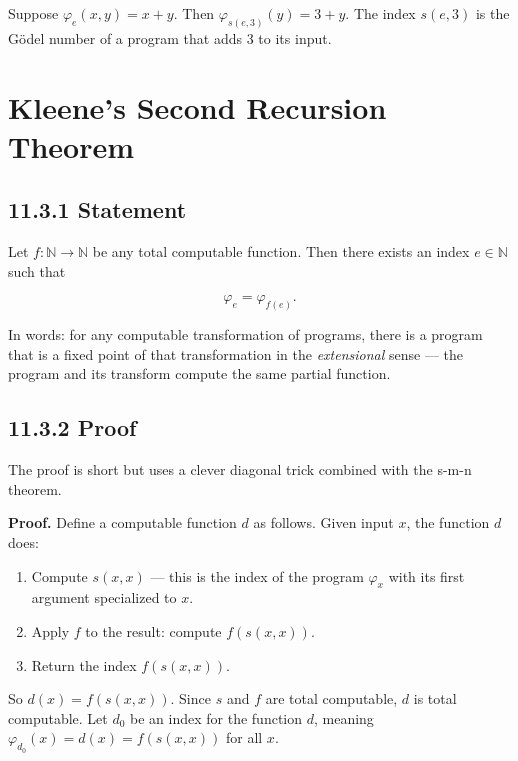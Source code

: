 \begin{example}
Suppose $\varphi_e(x, y) = x + y$. Then $\varphi_{s(e, 3)}(y) = 3 + y$. The index $s(e, 3)$ is the Gödel number of a program that adds 3 to its input.
\end{example}

\section{Kleene's Second Recursion Theorem}

\subsection{11.3.1 Statement}

\begin{theorem}
Let $f: \mathbb{N} \to \mathbb{N}$ be any total computable function. Then there exists an index $e \in \mathbb{N}$ such that

\[\varphi_e = \varphi_{f(e)}.\]

In words: for any computable transformation of programs, there is a program that is a fixed point of that transformation in the \textit{extensional} sense --- the program and its transform compute the same partial function.
\end{theorem}

\subsection{11.3.2 Proof}

The proof is short but uses a clever diagonal trick combined with the s-m-n theorem.

\textbf{Proof.} Define a computable function $d$ as follows. Given input $x$, the function $d$ does:

\begin{enumerate}
\item Compute $s(x, x)$ --- this is the index of the program $\varphi_x$ with its first argument specialized to $x$.
\item Apply $f$ to the result: compute $f(s(x, x))$.
\item Return the index $f(s(x, x))$.
\end{enumerate}

So $d(x) = f(s(x, x))$. Since $s$ and $f$ are total computable, $d$ is total computable. Let $d_0$ be an index for the function $d$, meaning $\varphi_{d_0}(x) = d(x) = f(s(x, x))$ for all $x$.

